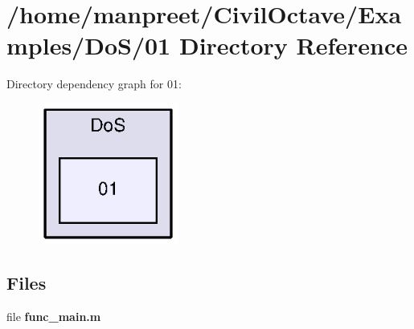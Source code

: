 \section{/home/manpreet/\-Civil\-Octave/\-Examples/\-Do\-S/01 Directory Reference}
\label{dir_f8db1994155e756552e24773ff4b38e5}
Directory dependency graph for 01\-:
\nopagebreak
\begin{figure}[H]
\begin{center}
\leavevmode
\includegraphics[width=130pt]{dir_f8db1994155e756552e24773ff4b38e5_dep}
\end{center}
\end{figure}
\subsection*{Files}
\begin{DoxyCompactItemize}
\item 
file {\bf func\-\_\-main.\-m}
\end{DoxyCompactItemize}
